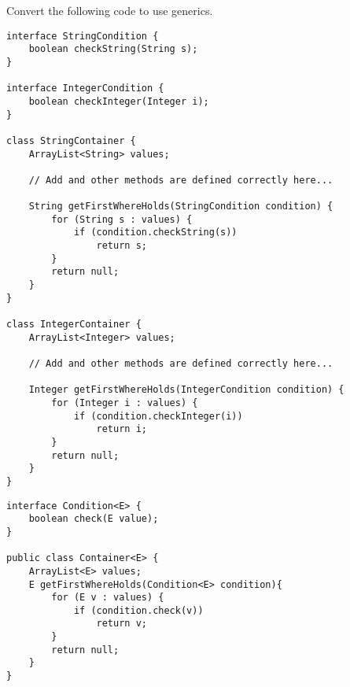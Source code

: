 Convert the following code to use generics.
\begin{lstlisting}
interface StringCondition {
	boolean checkString(String s);
}

interface IntegerCondition {
	boolean checkInteger(Integer i);
}

class StringContainer {
	ArrayList<String> values;
	
	// Add and other methods are defined correctly here...

	String getFirstWhereHolds(StringCondition condition) {
		for (String s : values) {
			if (condition.checkString(s))
				return s;
		}
		return null;
	}
}

class IntegerContainer {
	ArrayList<Integer> values;

	// Add and other methods are defined correctly here...

	Integer getFirstWhereHolds(IntegerCondition condition) {
		for (Integer i : values) {
			if (condition.checkInteger(i))
				return i;
		}
		return null;
	}
}
\end{lstlisting}

\begin{answer}
\begin{lstlisting}
interface Condition<E> {
	boolean check(E value);
}

public class Container<E> {
	ArrayList<E> values;
	E getFirstWhereHolds(Condition<E> condition){
		for (E v : values) {
			if (condition.check(v))
				return v;
		}
		return null;
	}
}
\end{lstlisting}
\end{answer}